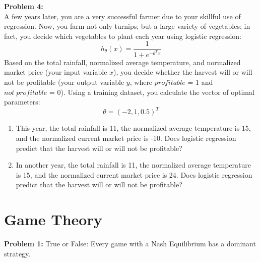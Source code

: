 \documentclass[a4paper]{article}
\newif\ifsol
\begin{document}
    \noindent \textbf{Problem 4:}\\
    A few years later, you are a very successful farmer due to your skillful use of regression. Now, you farm not only turnips, but a large variety of vegetables; in fact, you decide which vegetables to plant each year using logistic regression:
    \[
    h_{\theta}(x) = \frac{1}{1 + e^{-\theta^T x}}
    \]
    Based on the total rainfall, normalized average temperature, and normalized market price (your input variable $x$), you decide whether the harvest will or will not be profitable (your output variable $y$, where $profitable$ = 1 and $not \;profitable$ = 0). Using a training dataset, you calculate the vector of optimal parameters:
    \[
    \theta = (-2, 1, 0.5)^T
    \]
    \begin{enumerate}
        \item This year, the total rainfall is 11, the normalized average temperature is 15, and the normalized current market price is -10. Does logistic regression predict that the harvest will or will not be profitable? \\
        \ifsol 
        {\color{blue} \noindent We can calculate the output of logistic regression by substituting new values into $h_{\theta}(x)$ above, and rounding to either 0 or 1. For this year, $-\theta^T x = -(-22 + 15 - 5) = 12$ so $h_{\theta}(x) = 1/(1 + e^{12})$ which is closer to 0 than 1. Therefore, the harvest is predicted to not be profitable.
        }
        \else \bigskip \bigskip \bigskip \bigskip \bigskip \bigskip
        \fi
        \bigskip
        
        \item In another year, the total rainfall is 11, the normalized average temperature is 15, and the normalized current market price is 24. Does logistic regression predict that the harvest will or will not be profitable? \\
        \ifsol 
        {\color{blue} \noindent Similarly to above, substitute: $-\theta^T x = -(-22 + 15 + 12) = -5$ so $h_{\theta}(x) = 1/(1 + e^{-5})$ which is closer to 1 than 0. Therefore, the harvest is predicted to be profitable.
        }
        \else \bigskip \bigskip \bigskip \bigskip \bigskip \bigskip
        \fi
        \bigskip
    \end{enumerate}
    
\newpage
\section{Game Theory}
    \noindent \textbf{Problem 1:} True or False: Every game with a Nash Equilibrium has a dominant strategy.\\
    \ifsol 
    {\color{blue} \noindent False. Many games have solutions that are mixed strategies -- for example (spoiler alert) the next two problems!}
    \else \bigskip \bigskip \bigskip
    \fi
    \bigskip
    
\end{document}
